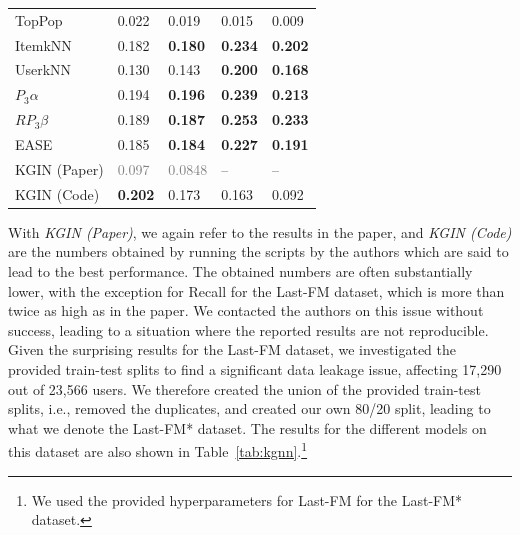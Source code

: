 \documentclass[sigconf,natbib=true,nonacm]{acmart}
\begin{document}
\begin{table}[htbp]
\begin{tabular}{l l l l l }
        TopPop                  & 0.022                   & 0.019                    & 0.015                   & 0.009                \\
        ItemkNN                 & 0.182                   & \textbf{0.180}           & \textbf{0.234}          & \textbf{0.202}        \\
        UserkNN                 & 0.130                   & 0.143                    & \textbf{0.200}          & \textbf{0.168}         \\
        $P_{3}\alpha$           & 0.194                   & \textbf{0.196}           & \textbf{0.239}          & \textbf{0.213}          \\
        $RP_{3}\beta$           & 0.189                   & \textbf{0.187}           &  \textbf{0.253}         & \textbf{0.233}                    \\
        EASE                    & 0.185                   & \textbf{0.184}           & \textbf{0.227}          & \textbf{0.191}     \\ \hline
        KGIN (Paper)            & \textcolor{gray}{0.097} & \textcolor{gray}{0.0848}           & --                   & --                   \\
        KGIN (Code)             & \textbf{0.202}          & 0.173           & 0.163                   & 0.092                   \\
    \end{tabular}
\end{table}

With \emph{KGIN (Paper)}, we again refer to the results in the paper, and \emph{KGIN (Code)} are the numbers obtained by running the scripts by the authors which are said to lead to the best performance. The obtained numbers are often substantially lower, with the exception for Recall for the Last-FM dataset, which is more than twice as high as in the paper. We contacted the authors on this issue without success, leading to a situation where the reported results are not reproducible. Given the surprising results for the Last-FM dataset, we investigated the provided train-test splits to find a significant data leakage issue, affecting 17,290 out of 23,566 users. We therefore created the union of the provided train-test splits, i.e., removed the duplicates, and created our own 80/20 split, leading to what we denote the Last-FM* dataset. The results for the different models on this dataset are also shown in Table~\ref{tab:kgnn}.\footnote{We used the provided hyperparameters for Last-FM for the Last-FM* dataset.}
\end{document}
